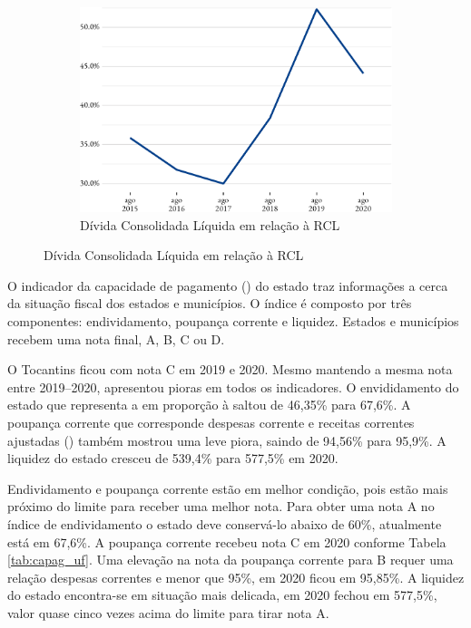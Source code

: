 \begin{figure}[!h]
	\begin{subfigure}{\linewidth}
		\caption{\label{fig:divida_rcl}Dívida Consolidada Líquida em relação à RCL}
		\includegraphics{fig/divida_rcl-1.pdf}
	\end{subfigure}
\end{figure}

O indicador da capacidade de pagamento () do estado traz
informações a cerca da situação fiscal dos estados e municípios. O
índice é composto por três componentes: endividamento, poupança corrente
e liquidez. Estados e municípios recebem uma nota final, A, B, C ou D.

O Tocantins ficou com nota C em 2019 e 2020. Mesmo mantendo a mesma nota
entre 2019--2020, apresentou pioras em todos os indicadores. O
envididamento do estado que representa a  em proporção à
 saltou de 46,35\% para 67,6\%. A poupança corrente que
corresponde despesas corrente e receitas correntes ajustadas
() também mostrou uma leve piora, saindo de 94,56\% para
95,9\%. A liquidez do estado cresceu de 539,4\% para 577,5\% em 2020.

Endividamento e poupança corrente estão em melhor condição, pois estão
mais próximo do limite para receber uma melhor nota. Para obter uma nota
A no índice de endividamento o estado deve conservá-lo abaixo de 60\%,
atualmente está em 67,6\%. A poupança corrente recebeu nota C em 2020
conforme Tabela \ref{tab:capag_uf}. Uma elevação na nota da poupança
corrente para B requer uma relação despesas correntes e  menor
que 95\%, em 2020 ficou em 95,85\%. A liquidez do estado encontra-se em
situação mais delicada, em 2020 fechou em 577,5\%, valor quase cinco
vezes acima do limite para tirar nota A.

